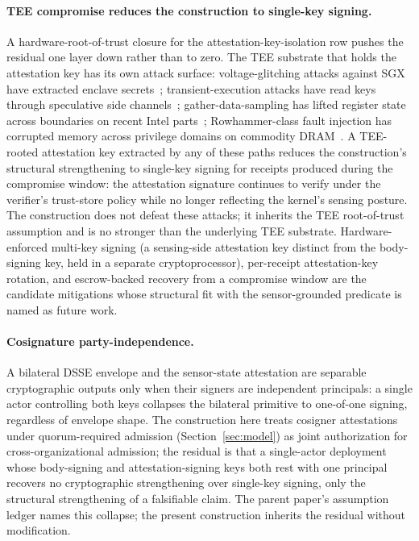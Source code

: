 \paragraph{TEE compromise reduces the construction to single-key signing.}
A hardware-root-of-trust closure for the attestation-key-isolation row pushes the residual one layer down rather than to zero. The TEE substrate that holds the attestation key has its own attack surface: voltage-glitching attacks against SGX have extracted enclave secrets~\cite{murdockPlundervolt2020}; transient-execution attacks have read keys through speculative side channels~\cite{vanbulckForeshadow2018}; gather-data-sampling has lifted register state across boundaries on recent Intel parts~\cite{moghimiDownfall2024}; Rowhammer-class fault injection has corrupted memory across privilege domains on commodity DRAM~\cite{koglerHalfDouble2022}. A TEE-rooted attestation key extracted by any of these paths reduces the construction's structural strengthening to single-key signing for receipts produced during the compromise window: the attestation signature continues to verify under the verifier's trust-store policy while no longer reflecting the kernel's sensing posture. The construction does not defeat these attacks; it inherits the TEE root-of-trust assumption and is no stronger than the underlying TEE substrate. Hardware-enforced multi-key signing (a sensing-side attestation key distinct from the body-signing key, held in a separate cryptoprocessor), per-receipt attestation-key rotation, and escrow-backed recovery from a compromise window are the candidate mitigations whose structural fit with the sensor-grounded predicate is named as future work.

\paragraph{Cosignature party-independence.}
A bilateral DSSE envelope and the sensor-state attestation are separable cryptographic outputs only when their signers are independent principals: a single actor controlling both keys collapses the bilateral primitive to one-of-one signing, regardless of envelope shape. The construction here treats cosigner attestations under quorum-required admission (Section~\ref{sec:model}) as joint authorization for cross-organizational admission; the residual is that a single-actor deployment whose body-signing and attestation-signing keys both rest with one principal recovers no cryptographic strengthening over single-key signing, only the structural strengthening of a falsifiable claim. The parent paper's assumption ledger names this collapse; the present construction inherits the residual without modification.

